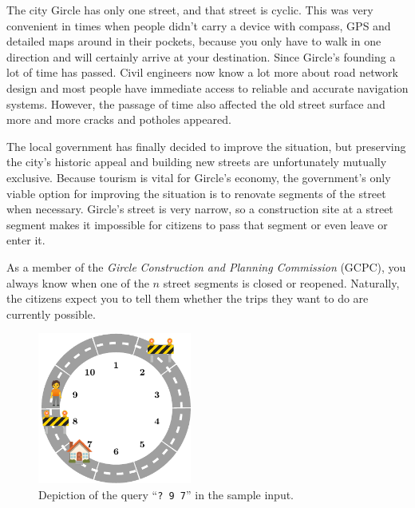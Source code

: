 
\newcommand{\cityname}[0]{Gircle}
\newcommand{\citynamefat}[0]{\textbf{G}ircle}
\newcommand{\citynameemph}[0]{\emph{Gircle}}


The city \cityname{} has only one street, and that street is cyclic.
This was very convenient in times when people didn't carry a device with
compass, GPS and detailed maps around in their pockets,
because you only have to walk in one direction and will certainly
arrive at your destination.
Since \cityname{}'s founding a lot of time has passed. Civil
engineers now know a lot more about road network design and most people have
immediate access to reliable and accurate navigation systems.
However, the passage of time also affected the old street surface and more and more
cracks and potholes appeared.

The local government has finally decided to improve the situation, but
preserving the city's historic appeal and building new streets are unfortunately mutually exclusive.
Because tourism is vital for \cityname{}'s economy, the government's only viable option for improving the situation is to renovate segments of the street when necessary.
\cityname{}'s street is very narrow, so a construction site at a street
segment makes it impossible for citizens to pass that segment or even leave or enter it.

As a member of the \citynameemph{} \emph{Construction and Planning Commission} (GCPC), you always know when one of the $n$ street segments
is closed or reopened.
Naturally, the citizens expect you to tell them whether the trips they
want to do are currently possible.

\begin{figure}[h]
	\centering
	\includegraphics[width=0.45\textwidth]{image}
	\caption{Depiction of the query ``\texttt{?~9 7}'' in the sample input.}
\end{figure}

